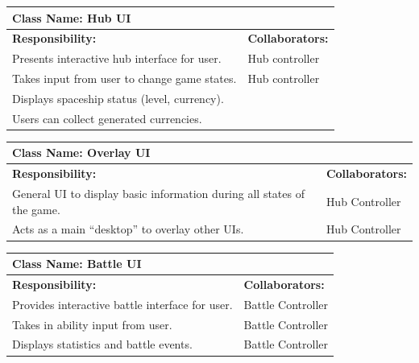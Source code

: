 \documentclass[]{article}
\begin{document}
\begin{table}[H]
	\centering
	\begin{tabular}{|p{8cm}|p{5cm}|}
	\hline 
	 \multicolumn{2}{|l|}{\textbf{Class Name:} Hub UI} \\
	\hline
	\textbf{Responsibility:} & \textbf{Collaborators:} \\
	\hline
    Presents interactive hub interface for user. & Hub controller\\
    \hline 
    Takes input from user to change game states. & Hub controller\\
    \hline 
    Displays spaceship status (level, currency). & \\
    \hline 
    Users can collect generated currencies. &\\
    \hline
	\end{tabular}
\end{table}

\begin{table}[H]
	\centering
	\begin{tabular}{|p{8cm}|p{5cm}|}
	\hline 
	 \multicolumn{2}{|l|}{\textbf{Class Name: } Overlay UI} \\
	\hline
	\textbf{Responsibility:} & \textbf{Collaborators:} \\
	\hline
	General UI to display basic information during all states of the game. & Hub Controller\\
	\hline 
    Acts as a main “desktop” to overlay other UIs. & Hub Controller\\
    \hline
	\end{tabular}
\end{table}

\begin{table}[H]
	\centering
	\begin{tabular}{|p{8cm}|p{5cm}|}
	\hline 
	 \multicolumn{2}{|l|}{\textbf{Class Name:} Battle UI} \\
	\hline
	\textbf{Responsibility:} & \textbf{Collaborators:} \\
	\hline
    Provides interactive battle interface for user. & Battle Controller\\
    \hline 
    Takes in ability input from user. & Battle Controller\\
    \hline
    Displays statistics and battle events. & Battle Controller\\
    \hline
	\end{tabular}
\end{table}

\end{document}
